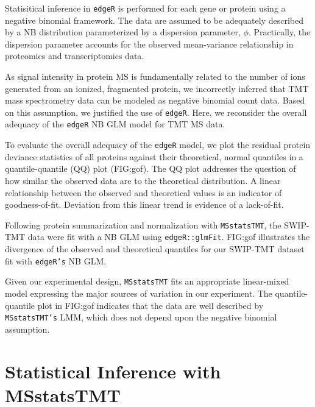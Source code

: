 \documentclass[11pt]{elife}\usepackage[]{graphicx}\usepackage[]{color}
\begin{document}
Statisitical inference in \texttt{edgeR} is performed for each gene or protein 
using a negative binomial framework. The data are assumed to 
be adequately described by a NB distribution parameterized by a dispersion 
parameter, $\phi$. Practically, the dispersion parameter accounts for the
observed mean-variance relationship in proteomics and transcriptomics data.

As signal intensity in protein MS is fundamentally related to the number of ions generated from
an ionized, fragmented protein, we incorrectly inferred that TMT
mass spectrometry data can be modeled as negative binomial count data. Based on
this assumption, we justified the use of \texttt{edgeR}.  Here, we reconsider
the overall adequacy of the \texttt{edgeR} NB GLM model for TMT MS data.

To evaluate the overall adequacy of the \texttt{edgeR} model, we plot the
residual protein deviance statistics of all proteins against their theoretical,
normal quantiles in a quantile-quantile (QQ) plot (FIG:gof).  The QQ plot
addresses the question of how similar the observed data are to the theoretical
distribution.  A linear relationship between the observed and theoretical
values is an indicator of goodness-of-fit.  Deviation from this linear trend is
evidence of a lack-of-fit.

Following protein summarization and normalization with \texttt{MSstatsTMT}, the
SWIP-TMT data were fit with a NB GLM using \texttt{edgeR::glmFit}. FIG:gof illustrates
the divergence of the observed and theoretical quantiles for our SWIP-TMT
dataset fit with \texttt{edgeR's} NB GLM.

Given our experimental design, \texttt{MSstatsTMT} fits an
appropriate linear-mixed model expressing the major sources of variation in our
experiment.  The quantile-quantile plot in FIG:gof indicates that the data are
well described by \texttt{MSstatsTMT's} LMM, which does not depend
upon the negative binomial assumption.


\section{Statistical Inference with MSstatsTMT}
\end{document}
